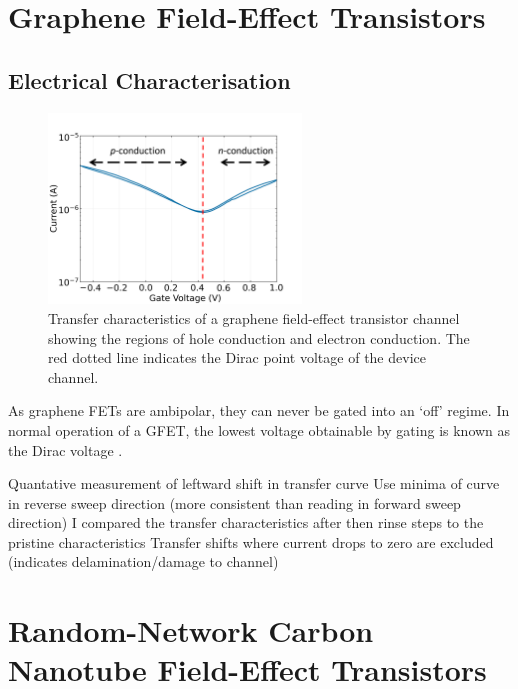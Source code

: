 \documentclass[
  a4paper,
]{scrbook}
\begin{document}
\hypertarget{graphene-field-effect-transistors}{%
\section{Graphene Field-Effect
Transistors}\label{graphene-field-effect-transistors}}

\hypertarget{sec-electrical-characterisation-graphene}{%
\subsection{Electrical
Characterisation}\label{sec-electrical-characterisation-graphene}}

\begin{figure}

{\centering \includegraphics[width=0.6\textwidth,height=\textheight]{figures/ch2/Graphene_transfer.png}

}

\caption{\label{fig-linker-raman}Transfer characteristics of a graphene
field-effect transistor channel showing the regions of hole conduction
and electron conduction. The red dotted line indicates the Dirac point
voltage of the device channel.}

\end{figure}

As graphene FETs are ambipolar, they can never be gated into an `off'
regime. In normal operation of a GFET, the lowest voltage obtainable by
gating is known as the Dirac voltage \autocite{Murugathas2020}.

Quantative measurement of leftward shift in transfer curve Use minima of
curve in reverse sweep direction (more consistent than reading in
forward sweep direction) I compared the transfer characteristics after
then rinse steps to the pristine characteristics Transfer shifts where
current drops to zero are excluded (indicates delamination/damage to
channel)

\hypertarget{random-network-carbon-nanotube-field-effect-transistors}{%
\section{Random-Network Carbon Nanotube Field-Effect
Transistors}\label{random-network-carbon-nanotube-field-effect-transistors}}
\end{document}
